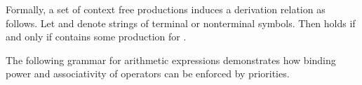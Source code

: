 \begin{isabellebody}
\begin{isamarkuptext}
  \medskip Formally, a set of context free productions 
  induces a derivation relation  as follows.  Let  and  denote strings of terminal or nonterminal symbols.
  Then  holds if and only if 
  contains some production  for .

  \medskip The following grammar for arithmetic expressions
  demonstrates how binding power and associativity of operators can be
  enforced by priorities.


\end{isamarkuptext}
\end{isabellebody}
